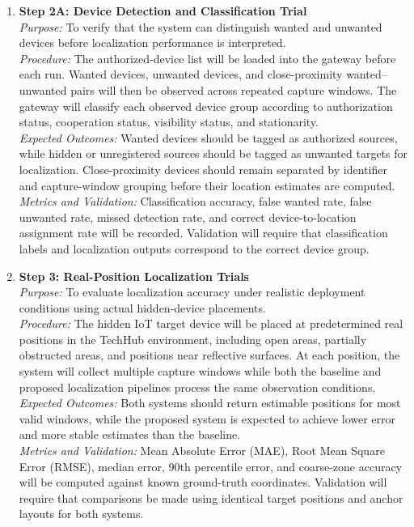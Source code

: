 \begin{enumerate}
    \item \textbf{Step 2A: Device Detection and Classification Trial} \\
    \textit{Purpose:} To verify that the system can distinguish wanted and unwanted devices before localization performance is interpreted. \\
    \textit{Procedure:} The authorized-device list will be loaded into the gateway before each run. Wanted devices, unwanted devices, and close-proximity wanted--unwanted pairs will then be observed across repeated capture windows. The gateway will classify each observed device group according to authorization status, cooperation status, visibility status, and stationarity. \\
    \textit{Expected Outcomes:} Wanted devices should be tagged as authorized sources, while hidden or unregistered sources should be tagged as unwanted targets for localization. Close-proximity devices should remain separated by identifier and capture-window grouping before their location estimates are computed. \\
    \textit{Metrics and Validation:} Classification accuracy, false wanted rate, false unwanted rate, missed detection rate, and correct device-to-location assignment rate will be recorded. Validation will require that classification labels and localization outputs correspond to the correct device group.

    \item \textbf{Step 3: Real-Position Localization Trials} \\
    \textit{Purpose:} To evaluate localization accuracy under realistic deployment conditions using actual hidden-device placements. \\
    \textit{Procedure:} The hidden IoT target device will be placed at predetermined real positions in the TechHub environment, including open areas, partially obstructed areas, and positions near reflective surfaces. At each position, the system will collect multiple capture windows while both the baseline and proposed localization pipelines process the same observation conditions. \\
    \textit{Expected Outcomes:} Both systems should return estimable positions for most valid windows, while the proposed system is expected to achieve lower error and more stable estimates than the baseline. \\
    \textit{Metrics and Validation:} Mean Absolute Error (MAE), Root Mean Square Error (RMSE), median error, 90th percentile error, and coarse-zone accuracy will be computed against known ground-truth coordinates. Validation will require that comparisons be made using identical target positions and anchor layouts for both systems.


\end{enumerate}
